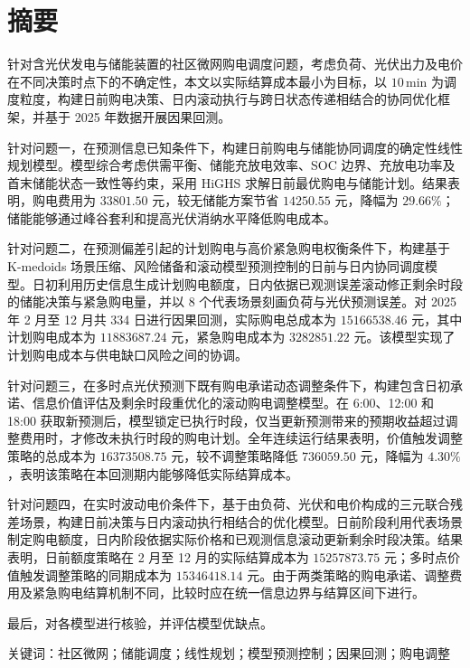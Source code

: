 \section*{摘要}
针对含光伏发电与储能装置的社区微网购电调度问题，考虑负荷、光伏出力及电价在不同决策时点下的不确定性，本文以实际结算成本最小为目标，以 $10\,\mathrm{min}$ 为调度粒度，构建日前购电决策、日内滚动执行与跨日状态传递相结合的协同优化框架，并基于 2025 年数据开展因果回测。

针对问题一，在预测信息已知条件下，构建日前购电与储能协同调度的确定性线性规划模型。模型综合考虑供需平衡、储能充放电效率、SOC 边界、充放电功率及首末储能状态一致性等约束，采用 HiGHS 求解日前最优购电与储能计划。结果表明，购电费用为 $33801.50$ 元，较无储能方案节省 $14250.55$ 元，降幅为 $29.66\%$；储能能够通过峰谷套利和提高光伏消纳水平降低购电成本。

针对问题二，在预测偏差引起的计划购电与高价紧急购电权衡条件下，构建基于 K-medoids 场景压缩、风险储备和滚动模型预测控制的日前与日内协同调度模型。日初利用历史信息生成计划购电额度，日内依据已观测误差滚动修正剩余时段的储能决策与紧急购电量，并以 8 个代表场景刻画负荷与光伏预测误差。对 2025 年 2 月至 12 月共 334 日进行因果回测，实际购电总成本为 $15166538.46$ 元，其中计划购电成本为 $11883687.24$ 元，紧急购电成本为 $3282851.22$ 元。该模型实现了计划购电成本与供电缺口风险之间的协调。

针对问题三，在多时点光伏预测下既有购电承诺动态调整条件下，构建包含日初承诺、信息价值评估及剩余时段重优化的滚动购电调整模型。在 6:00、12:00 和 18:00 获取新预测后，模型锁定已执行时段，仅当更新预测带来的预期收益超过调整费用时，才修改未执行时段的购电计划。全年连续运行结果表明，价值触发调整策略的总成本为 $16373508.75$ 元，较不调整策略降低 $736059.50$ 元，降幅为 $4.30\%$，表明该策略在本回测期内能够降低实际结算成本。

针对问题四，在实时波动电价条件下，基于由负荷、光伏和电价构成的三元联合残差场景，构建日前决策与日内滚动执行相结合的优化模型。日前阶段利用代表场景制定购电额度，日内阶段依据实际价格和已观测信息滚动更新剩余时段决策。结果表明，日前额度策略在 2 月至 12 月的实际结算成本为 $15257873.75$ 元；多时点价值触发调整策略的同期成本为 $15346418.14$ 元。由于两类策略的购电承诺、调整费用及紧急购电结算机制不同，比较时应在统一信息边界与结算区间下进行。

最后，对各模型进行核验，并评估模型优缺点。

\par\noindent 关键词：社区微网；储能调度；线性规划；模型预测控制；因果回测；购电调整
